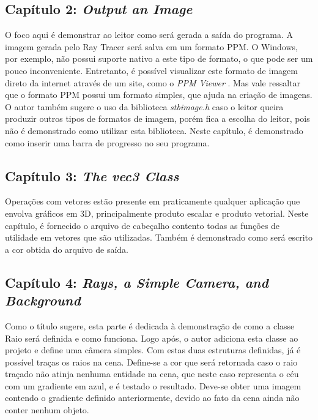 \documentclass[journal]{IEEEtran}
\begin{document}
\subsection*{Capítulo 2: \emph{Output an Image}}
O foco aqui é demonstrar ao leitor como será gerada a saída do programa. A imagem gerada
pelo Ray Tracer será salva em um formato PPM. O Windows, por exemplo, não possui suporte
nativo a este tipo de formato, o que pode ser um pouco inconveniente. Entretanto, é possível
visualizar este formato de imagem direto da internet através de um site, como o \emph{PPM Viewer}
\cite{PPMviewer}. Mas vale ressaltar que o formato PPM possui um formato simples, que ajuda
na criação de imagens. O autor também sugere o uso da biblioteca \emph{stb\textunderscore image.h}
\cite{stb-rep} caso o leitor queira produzir outros tipos de formatos de imagem, porém fica a
escolha do leitor, pois não é demonstrado como utilizar esta biblioteca. Neste capítulo, é
demonstrado como inserir uma barra de progresso no seu programa.

\subsection*{Capítulo 3: \emph{The vec3 Class}}
Operações com vetores estão presente em praticamente qualquer aplicação que envolva gráficos em 3D,
principalmente produto escalar e produto vetorial. Neste capítulo, é fornecido o arquivo de 
cabeçalho contento todas as funções de utilidade em vetores que são utilizadas. Também é demonstrado
como será escrito a cor obtida do arquivo de saída.

\subsection*{Capítulo 4: \emph{Rays, a Simple Camera, and Background}}
Como o título sugere, esta parte é dedicada à demonstração de como a classe Raio será definida e
como funciona. Logo após, o autor adiciona esta classe ao projeto e define uma câmera simples.
Com estas duas estruturas definidas, já
é possível traças os raios na cena. Define-se a cor que será retornada caso o raio traçado não
atinja nenhuma entidade na cena, que neste caso representa o céu com um gradiente em azul, e é testado
o resultado. Deve-se obter uma imagem contendo o gradiente definido anteriormente, devido ao fato
da cena ainda não conter nenhum objeto.
\end{document}
